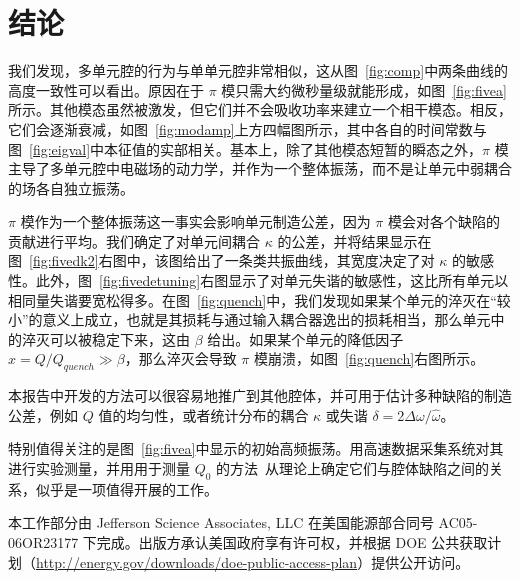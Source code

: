 \documentclass[12pt]{article}
\newcommand\ho{\hat\omega}
\newcommand\Do{\Delta\omega}
\begin{document}
\section{结论}
%
我们发现，多单元腔的行为与单单元腔非常相似，这从图~\ref{fig:comp}中两条曲线的高度一致性可以看出。原因在于 $\pi$ 模只需大约微秒量级就能形成，如图~\ref{fig:fivea}所示。其他模态虽然被激发，但它们并不会吸收功率来建立一个相干模态。相反，它们会逐渐衰减，如图~\ref{fig:modamp}上方四幅图所示，其中各自的时间常数与图~\ref{fig:eigval}中本征值的实部相关。基本上，除了其他模态短暂的瞬态之外，$\pi$ 模主导了多单元腔中电磁场的动力学，并作为一个整体振荡，而不是让单元中弱耦合的场各自独立振荡。
\par
$\pi$ 模作为一个整体振荡这一事实会影响单元制造公差，因为 $\pi$ 模会对各个缺陷的贡献进行平均。我们确定了对单元间耦合 $\kappa$ 的公差，并将结果显示在图~\ref{fig:fivedk2}右图中，该图给出了一条类共振曲线，其宽度决定了对 $\kappa$ 的敏感性。此外，图~\ref{fig:fivedetuning}右图显示了对单元失谐的敏感性，这比所有单元以相同量失谐要宽松得多。在图~\ref{fig:quench}中，我们发现如果某个单元的淬灭在“较小”的意义上成立，也就是其损耗与通过输入耦合器逸出的损耗相当，那么单元中的淬灭可以被稳定下来，这由 $\beta$ 给出。如果某个单元的降低因子 $x=Q/Q_{quench}\gg\beta$，那么淬灭会导致 $\pi$ 模崩溃，如图~\ref{fig:quench}右图所示。
\par
本报告中开发的方法可以很容易地推广到其他腔体，并可用于估计多种缺陷的制造公差，例如 $Q$ 值的均匀性，或者统计分布的耦合 $\kappa$ 或失谐 $\delta=2\Do/\ho$。
\par
特别值得关注的是图~\ref{fig:fivea}中显示的初始高频振荡。用高速数据采集系统对其进行实验测量，并用用于测量 $Q_0$ 的方法~\cite{Q0}从理论上确定它们与腔体缺陷之间的关系，似乎是一项值得开展的工作。
\par
本工作部分由 Jefferson Science Associates, LLC 在美国能源部合同号 AC05-06OR23177 下完成。出版方承认美国政府享有许可权，并根据 DOE 公共获取计划（\url{http://energy.gov/downloads/doe-public-access-plan}）提供公开访问。
%
%

\end{document}
